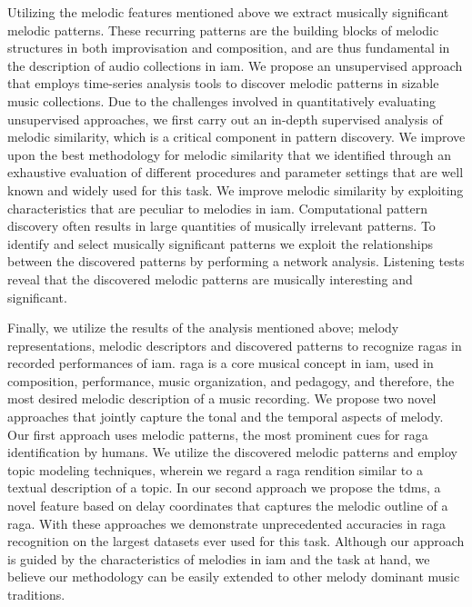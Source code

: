 Utilizing the melodic features mentioned above we extract musically significant melodic patterns. These recurring patterns are the building blocks of melodic structures in both improvisation and composition, and are thus fundamental in the description of audio collections in \gls{iam}. We propose an unsupervised approach that employs time-series analysis tools to discover melodic patterns in sizable music collections. Due to the challenges involved in quantitatively evaluating unsupervised approaches, we first carry out an in-depth supervised analysis of  melodic similarity, which is a critical component in pattern discovery. We improve upon the best methodology for melodic similarity that we identified through an exhaustive evaluation of different procedures and parameter settings that are well known and widely used for this task. We improve melodic similarity by exploiting characteristics that are peculiar to melodies in \gls{iam}. Computational pattern discovery often results in large quantities of musically irrelevant patterns. To identify and select musically significant patterns we exploit the relationships between the discovered patterns by performing a network analysis. Listening tests reveal that the discovered melodic patterns are musically interesting and significant.

Finally, we utilize the results of the analysis  mentioned above; melody representations, melodic descriptors and discovered patterns to recognize \glspl{raga} in recorded performances of \gls{iam}. \Gls{raga} is a core musical concept in \gls{iam}, used in composition, performance, music organization, and pedagogy, and therefore, the most desired melodic description of a music recording. We propose two novel approaches that jointly capture the tonal and the temporal aspects of melody. Our first approach uses melodic patterns, the most prominent cues for raga identification by humans. We utilize the discovered melodic patterns and employ topic modeling techniques, wherein we regard a \gls{raga} rendition similar to a textual description of a topic. In our second approach we propose the \gls{tdms}, a novel feature based on delay coordinates that captures the melodic outline of a \gls{raga}. With these approaches we demonstrate unprecedented accuracies in \gls{raga} recognition on the largest datasets ever used for this task.  Although our approach is guided by the characteristics of melodies in \gls{iam} and the task at hand, we believe our methodology can be easily extended to other melody dominant music traditions.

